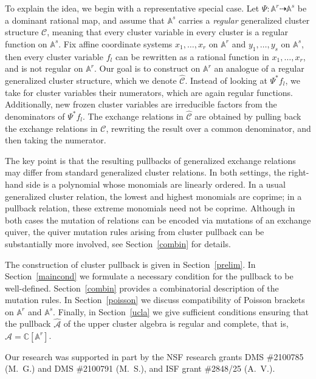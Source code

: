 \documentclass{amsart}
\theoremstyle{definition}
\theoremstyle{remark}
\numberwithin{equation}{section}
\numberwithin{theorem}{section}
\def\A{{\mathcal A}}
\def\AA{{\mathbb A}}
\def\C{{\mathbb C}}
\def\CC{{\mathcal C}}
\begin{document}
To explain the idea, we begin with a representative special case. Let
$\Psi:\AA^{r}\dashrightarrow \AA^{s}$ be a dominant rational map, and assume that $\AA^{s}$ carries a \emph{regular\/} generalized cluster structure $\CC$, meaning that every cluster variable in every cluster is a regular function on 
$\AA^s$. Fix affine coordinate systems $x_1,\dots,x_r$ on $\AA^{r}$ and $y_1,\dots,y_s$ on $\AA^{s}$, then every cluster variable 
$f_l$ can be rewritten as a rational function in $x_1,\dots,x_r$, and is not regular on $\AA^r$.
 Our goal is to construct on $\AA^{r}$ an analogue  of a regular generalized cluster structure, which we denote
 $\widehat{\CC}$.
Instead of looking at $\Psi^*f_l$, we take for cluster variables their numerators, which are again regular functions. Additionally, new frozen cluster variables are irreducible factors from the denominators of $\Psi^*f_l$. 
The exchange relations in $\widehat{\CC}$ are obtained by pulling back the exchange relations in $\CC$, rewriting the result over a common denominator, and then taking the numerator.

The key point is that the resulting pullbacks of generalized exchange relations may differ from standard generalized cluster relations. In both settings, the right-hand side is a polynomial whose monomials are linearly ordered. In a usual generalized cluster relation, the lowest and highest monomials are coprime; in a pullback relation, these extreme monomials need not be coprime.
Although in both cases the mutation of relations can be encoded via mutations of an exchange quiver, the quiver mutation rules arising from cluster pullback can be substantially more involved, see Section~\ref{combin} for details.

The construction of cluster pullback is given in Section~\ref{prelim}. In Section~\ref{maincond} we formulate a necessary condition for the pullback to be well-defined. Section~\ref{combin} provides a combinatorial description of the mutation rules. In Section~\ref{poisson} we discuss compatibility of Poisson brackets on $\AA^{r}$ and $\AA^{s}$. Finally, in Section~\ref{ucla} we give sufficient conditions ensuring that the pullback $\widehat{\A}$ of the upper cluster algebra is regular and complete, that is, $\widehat{\A}=\C[\AA^{r}]$.

Our research was supported in part by the NSF research grants DMS \#2100785 (M.~G.) and  DMS \#2100791 (M.~S.), and ISF grant \#2848/25 (A.~V.).  
\end{document}
